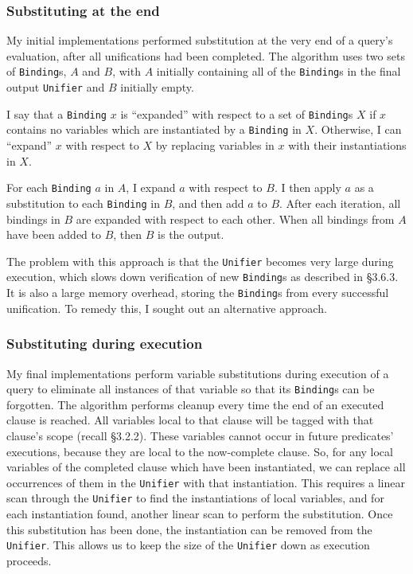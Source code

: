 \documentclass[12pt]{article}
\begin{document}
\subsubsection{Substituting at the end}

My initial implementations performed substitution at the very end of a query's evaluation, after all unifications had been completed. 
The algorithm uses two sets of \verb|Binding|s, $A$ and $B$, with $A$ initially containing all of the \verb|Binding|s in the final output \verb|Unifier| and $B$ initially empty.

I say that a \verb|Binding| $x$ is ``expanded'' with respect to a set of \verb|Binding|s $X$ if $x$ contains no variables which are instantiated by a \verb|Binding| in $X$. 
Otherwise, I can ``expand'' $x$ with respect to $X$ by replacing variables in $x$ with their instantiations in $X$.

For each \verb|Binding| $a$ in $A$, I expand $a$ with respect to $B$. 
I then apply $a$ as a substitution to each \verb|Binding| in $B$, and then add $a$ to $B$. 
After each iteration, all bindings in $B$ are expanded with respect to each other. 
When all bindings from $A$ have been added to $B$, then $B$ is the output.

The problem with this approach is that the \verb|Unifier| becomes very large during execution, which slows down verification of new \verb|Binding|s as described in \S3.6.3. 
It is also a large memory overhead, storing the \verb|Binding|s from every successful unification.
To remedy this, I sought out an alternative approach.

\subsubsection{Substituting during execution}

My final implementations perform variable substitutions during execution of a query to eliminate all instances of that variable so that its \verb|Binding|s can be forgotten.
The algorithm performs cleanup every time the end of an executed clause is reached.
All variables local to that clause will be tagged with that clause's scope (recall \S3.2.2).
These variables cannot occur in future predicates' executions, because they are local to the now-complete clause.
So, for any local variables of the completed clause which have been instantiated, we can replace all occurrences of them in the \verb|Unifier| with that instantiation. 
This requires a linear scan through the \verb|Unifier| to find the instantiations of local variables, and for each instantiation found, another linear scan to perform the substitution.
Once this substitution has been done, the instantiation can be removed from the \verb|Unifier|.
This allows us to keep the size of the \verb|Unifier| down as execution proceeds.
\end{document}
